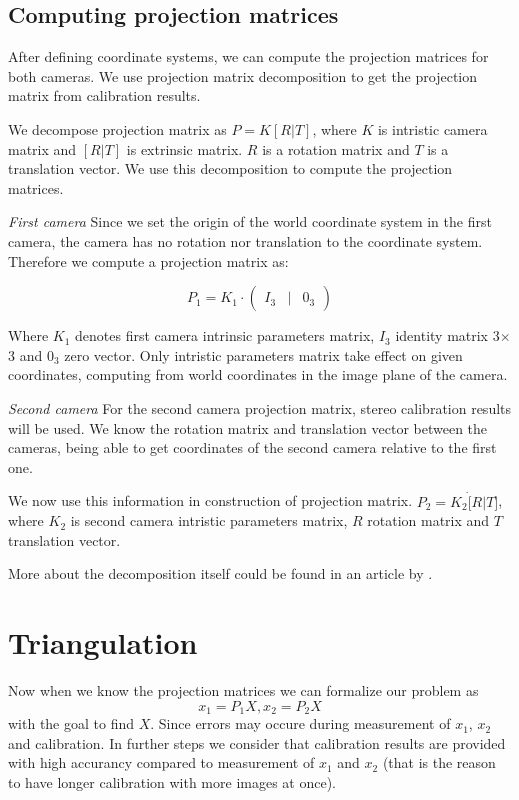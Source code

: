 \subsection{Computing projection matrices}
After defining coordinate systems, we can compute the projection matrices for
both cameras. We use projection matrix decomposition to get the projection matrix
from calibration results.

We decompose projection matrix as $P = K[R|T]$, where $K$ is intristic
camera matrix and $[R|T]$ is extrinsic matrix. $R$ is a rotation matrix and
$T$ is a translation vector. We use this decomposition to compute the projection
matrices.

\emph{First camera}
Since we set the origin of the world coordinate system in the first camera,
the camera has no rotation nor translation to the coordinate system. Therefore
we compute a projection matrix as:

\[
 P_1 = K_1 \cdot \begin{pmatrix}
	I_3 & | & 0_3  
\end{pmatrix}
\]

Where $K_1$ denotes first camera intrinsic parameters matrix, $I_3$ identity
matrix 3$\times$3 and $0_3$ zero vector. Only intristic parameters matrix take
effect on given coordinates, computing from world coordinates in the image plane of the camera.

\emph{Second camera}
For the second camera projection matrix, stereo calibration results will be
used. We know the rotation matrix and translation vector between the cameras,
being able to get coordinates of the second camera relative to the first one.

We now use this information in construction of projection matrix. $P_2 = K_2
\dot [R | T]$, where $K_2$ is second camera intristic parameters matrix, $R$
rotation matrix and $T$ translation vector.

More about the decomposition itself could be found in an article by
\citet{computervisionblog}.


\section{Triangulation}
Now when we know the projection matrices we can formalize our problem as
\begin{equation}
x_1 = P_1X, x_2 = P_2X \label{projection-statements}
\end{equation}
with the goal to find $X$. Since errors may occure during
measurement of $x_1$, $x_2$ and calibration. In further steps we consider that
calibration results are provided with high accurancy compared to measurement of
$x_1$ and $x_2$ (that is the reason to have longer calibration with more images
at once).

